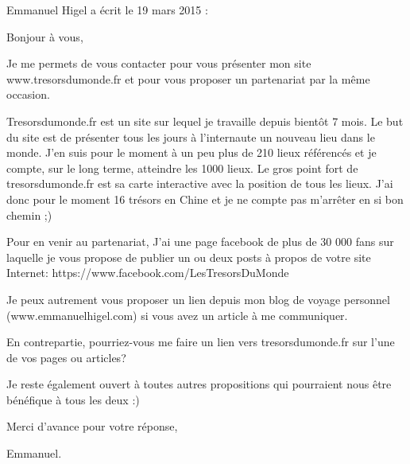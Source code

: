 \medskip
Emmanuel Higel a écrit le 19 mars 2015 :
\begin{displayquote}
Bonjour à vous,

Je me permets de vous contacter pour vous présenter mon site www.tresorsdumonde.fr et pour vous proposer un partenariat par la même occasion.

Tresorsdumonde.fr est un site sur lequel je travaille depuis bientôt 7 mois. Le but du site est de présenter tous les jours à l'internaute un nouveau lieu dans le monde.
J'en suis pour le moment à un peu plus de 210 lieux référencés et je compte, sur le long terme, atteindre les 1000 lieux.
Le gros point fort de tresorsdumonde.fr est sa carte interactive avec la position de tous les lieux.
J'ai donc pour le moment 16 trésors en Chine et je ne compte pas m'arrêter en si bon chemin ;)

Pour en venir au partenariat, J'ai une page facebook de plus de 30 000 fans sur laquelle je vous propose de publier un ou deux posts à propos de votre site Internet:
https://www.facebook.com/LesTresorsDuMonde

Je peux autrement vous proposer un lien depuis mon blog de voyage personnel (www.emmanuelhigel.com) si vous avez un article à me communiquer.

En contrepartie, pourriez-vous me faire un lien vers tresorsdumonde.fr sur l'une de vos pages ou articles?

Je reste également ouvert à toutes autres propositions qui pourraient nous être bénéfique à tous les deux :)

Merci d'avance pour votre réponse,

Emmanuel.
\end{displayquote}

\vfill
